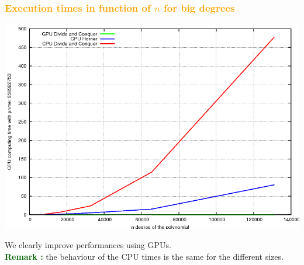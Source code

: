 \begin{frame}[fragile]
\frametitle{\textbf{\textcolor{orange}{Execution times in function of $n$ for big degrees}}}

\begin{center}
\includegraphics[scale=0.25]{eps/time_big_n.png}\\
\end{center}

We clearly improve performances using GPUs.\\
\textcolor{darkgreen}{\textbf{Remark :}} the behaviour of the CPU times is the same for the different sizes.

\end{frame}
